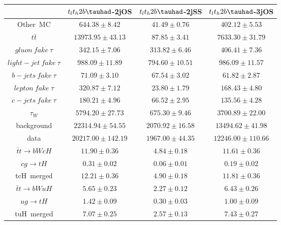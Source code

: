 \centering
\begin{tabular}{|c|c|c|c|} \hline
 & $t_{l}t_{h}2b\tauhad$-2jOS & $t_{l}t_{h}2b\tauhad$-2jSS & $t_{l}t_{h}2b\tauhad$-3jOS\\\hline
Other~MC & $644.38\pm8.42$ & $41.49\pm0.76$ & $402.12\pm5.53$\\\hline
$t\bar{t}$ & $13973.95\pm43.13$ & $87.85\pm3.41$ & $7633.30\pm31.79$\\\hline
$gluon~fake~\tau$ & $342.15\pm7.06$ & $313.82\pm6.46$ & $406.41\pm7.36$\\\hline
$light-jet~fake~\tau$ & $988.09\pm11.89$ & $794.60\pm10.51$ & $986.09\pm11.57$\\\hline
$b-jets~fake~\tau$ & $71.09\pm3.10$ & $67.54\pm3.02$ & $61.82\pm2.87$\\\hline
$lepton~fake~\tau$ & $320.87\pm7.12$ & $23.80\pm1.79$ & $168.43\pm4.80$\\\hline
$c-jets~fake~\tau$ & $180.21\pm4.96$ & $66.52\pm2.95$ & $135.56\pm4.28$\\\hline
$\tau_{W}$ & $5794.20\pm27.73$ & $675.30\pm9.46$ & $3700.89\pm22.00$\\\hline
background & $22314.94\pm54.55$ & $2070.92\pm16.58$ & $13494.62\pm41.98$\\\hline
data & $20217.00\pm142.19$ & $1967.00\pm44.35$ & $12246.00\pm110.66$\\\hline
$\bar{t}t\to bWcH$ & $11.90\pm0.36$ & $4.84\pm0.18$ & $11.61\pm0.36$\\\hline
$cg\to tH$ & $0.31\pm0.02$ & $0.06\pm0.01$ & $0.19\pm0.02$\\\hline
tcH~merged & $12.21\pm0.36$ & $4.90\pm0.18$ & $11.81\pm0.36$\\\hline
$\bar{t}t\to bWuH$ & $5.65\pm0.23$ & $2.27\pm0.12$ & $6.43\pm0.26$\\\hline
$ug\to tH$ & $1.42\pm0.09$ & $0.30\pm0.03$ & $1.00\pm0.09$\\\hline
tuH~merged & $7.07\pm0.25$ & $2.57\pm0.13$ & $7.43\pm0.27$\\\hline
\end{tabular}

